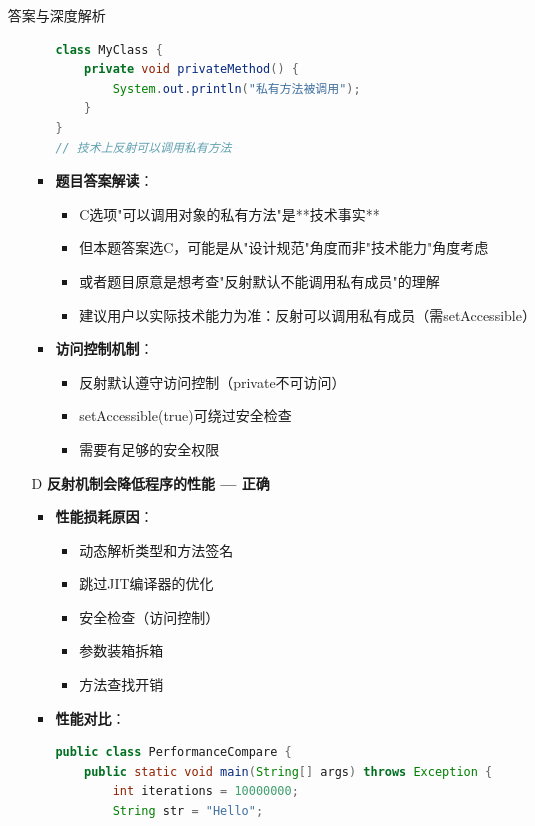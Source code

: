 \documentclass[12pt, a4paper]{ctexart}
\begin{document}
\begin{enumerate}[label=\textbf{\arabic*.}]
\begin{bluebox}{答案与深度解析}
\begin{itemize}[leftmargin=*, nosep, label={}]
\begin{itemize}[label={}, leftmargin=*, nosep]
\begin{lstlisting}[language=Java]
class MyClass {
    private void privateMethod() {
        System.out.println("私有方法被调用");
    }
}
// 技术上反射可以调用私有方法
					      \end{lstlisting}
				            \item \textbf{题目答案解读}：
				                  \begin{itemize}[label={}, nosep]
					                  \item C选项"可以调用对象的私有方法"是**技术事实**
					                  \item 但本题答案选C，可能是从"设计规范"角度而非"技术能力"角度考虑
					                  \item 或者题目原意是想考查"反射默认不能调用私有成员"的理解
					                  \item 建议用户以实际技术能力为准：反射可以调用私有成员（需setAccessible）
				                  \end{itemize}
				            \item \textbf{访问控制机制}：
				                  \begin{itemize}[label={}, nosep]
					                  \item 反射默认遵守访问控制（private不可访问）
					                  \item setAccessible(true)可绕过安全检查
					                  \item 需要有足够的安全权限
				                  \end{itemize}
			            \end{itemize}

			      \item[D] \textbf{反射机制会降低程序的性能 — 正确}
			            \begin{itemize}[label={}, leftmargin=*, nosep]
				            \item \textbf{性能损耗原因}：
				                  \begin{itemize}[label={}, nosep]
					                  \item 动态解析类型和方法签名
					                  \item 跳过JIT编译器的优化
					                  \item 安全检查（访问控制）
					                  \item 参数装箱拆箱
					                  \item 方法查找开销
				                  \end{itemize}
				            \item \textbf{性能对比}：
				                  \begin{lstlisting}[language=Java]
public class PerformanceCompare {
    public static void main(String[] args) throws Exception {
        int iterations = 10000000;
        String str = "Hello";


\end{lstlisting}
\end{itemize}
\end{itemize}
\end{bluebox}
\end{enumerate}
\end{document}
